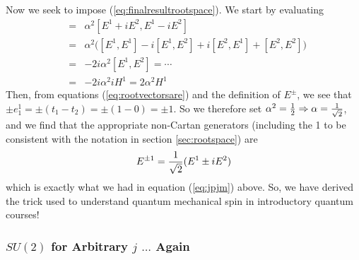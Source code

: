 \documentclass[12pt,epsf]{article}
\def\nolabel{\nonumber }
\def\nolabel{\nonumber }
\begin{document}
Now we seek to impose (\ref{eq:finalresultrootspace}).	We start by
evaluating
\begin{eqnarray}
[E^+,E^-] &=& \alpha^2[E^1+iE^2,E^1-iE^2] \nolabel \\
&=& \alpha^2\big([E^1,E^1]-i[E^1,E^2]+i[E^2,E^1]+[E^2,E^2]\big)
\nolabel \\
&=& -2i\alpha^2[E^1,E^2] = \cdots \nolabel \\
&=& -2i\alpha^2iH^1 = 2\alpha^2H^1\nolabel
\end{eqnarray}
Then, from equations (\ref{eq:rootvectorsare}) and the definition of
$E^{\pm}$, we see that $\pm e^1_1 = \pm (t_1-t_2) = \pm(1-0) = \pm 1$. 
So we therefore set $\alpha^2 = {1\over 2} \Rightarrow \alpha = {1\over
\sqrt{2}}$, and we find that the appropriate non-Cartan generators
(including the 1 to be consistent with the notation in section
\ref{sec:rootspace}) are
\begin{eqnarray}
E^{\pm 1} = {1\over \sqrt{2}} (E^1\pm iE^2) \label{eq:linearcombose}
\end{eqnarray}
which is exactly what we had in equation (\ref{eq:jpjm}) above.  So, we
have derived the trick used to understand quantum mechanical spin in
introductory quantum courses!  

\subsubsection{$SU(2)$ for Arbitrary $j$ $\ldots$ Again}
\end{document}
